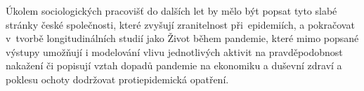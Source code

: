 Úkolem sociologických pracovišť do dalších let by mělo být popsat tyto slabé stránky české společnosti, které zvyšují zranitelnost při epidemiích, a pokračovat v tvorbě longitudinálních studií jako Život během pandemie, které mimo popsané výstupy umožňují i modelování vlivu jednotlivých aktivit na pravděpodobnost na\-ka\-že\-ní či popisují vztah dopadů pandemie na ekonomiku a duševní zdraví a poklesu ochoty dodržovat protiepidemická opatření.